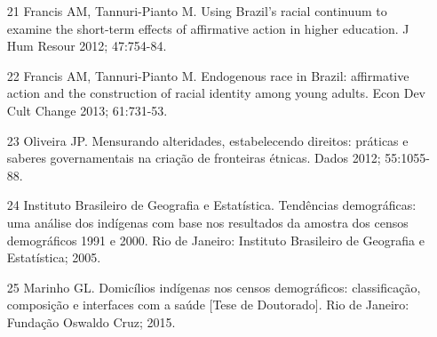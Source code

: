 \documentclass{article}
\begin{document}
\begin{itemize}
\item[21] Francis AM, Tannuri-Pianto M. Using Brazil's racial continuum to
examine the short-term effects of affirmative action in higher education. J Hum
Resour 2012; 47:754-84.

\item[22] Francis AM, Tannuri-Pianto M. Endogenous race in Brazil:
affirmative action and the construction of racial identity among young adults.
Econ Dev Cult Change 2013; 61:731-53.

\item[23] Oliveira JP. Mensurando alteridades, estabelecendo direitos:
práticas e saberes governamentais na criação de fronteiras étnicas. Dados 2012;
55:1055-88.

\item[24] Instituto Brasileiro de Geografia e Estatística. Tendências
demográficas: uma análise dos indígenas com base nos resultados da amostra dos
censos demográficos 1991 e 2000. Rio de Janeiro: Instituto Brasileiro de
Geografia e Estatística; 2005.

\item[25] Marinho GL. Domicílios indígenas nos censos demográficos:
classificação, composição e interfaces com a saúde [Tese de Doutorado]. Rio de
Janeiro: Fundação Oswaldo Cruz; 2015.

\end{itemize}
\end{document}
